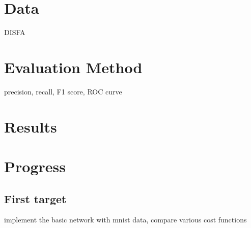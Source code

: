\documentclass[11pt]{article}
\begin{document}
\section{Data}
DISFA
\section{Evaluation Method}
precision, recall, F1 score, ROC curve 
\section{Results}
\section{Progress}
\subsection{First target}
implement the basic network with mnist data, compare various cost functions



\end{document}
